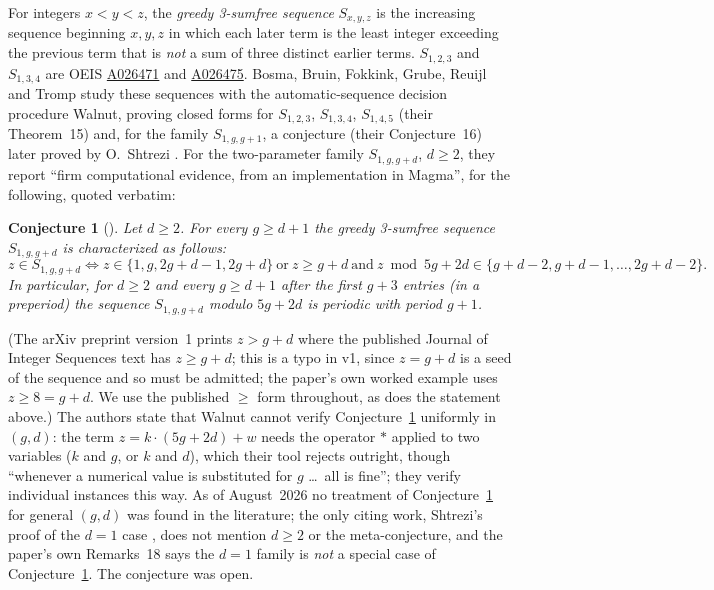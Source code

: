 \documentclass[10pt,reqno]{amsart}
\theoremstyle{plain}
\newtheorem{conjecture}[theorem]{Conjecture}
\theoremstyle{definition}
\theoremstyle{remark}
\numberwithin{theorem}{section}
\begin{document}
For integers $x<y<z$, the \emph{greedy 3-sumfree sequence} $S_{x,y,z}$ is the increasing
sequence beginning $x,y,z$ in which each later term is the least integer exceeding the
previous term that is \emph{not} a sum of three distinct earlier terms. $S_{1,2,3}$ and
$S_{1,3,4}$ are OEIS \href{https://oeis.org/A026471}{A026471} and
\href{https://oeis.org/A026475}{A026475}. Bosma, Bruin, Fokkink, Grube, Reuijl and Tromp
\cite{Fokkink} study these sequences with the automatic-sequence decision procedure Walnut,
proving closed forms for $S_{1,2,3}$, $S_{1,3,4}$, $S_{1,4,5}$ (their Theorem~15) and, for the
family $S_{1,g,g+1}$, a conjecture (their Conjecture~16) later proved by O.\ Shtrezi
\cite{Shtrezi}. For the two-parameter family $S_{1,g,g+d}$, $d \ge 2$, they report ``firm
computational evidence, from an implementation in Magma'', for the following, quoted
verbatim:

\begin{conjecture}[{\cite[Conjecture~17]{Fokkink}}]
\label{conj17}
Let $d\geq 2$. For every $g\geq d+1$ the greedy 3-sumfree sequence $S_{1,g,g+d}$ is
characterized as follows:
\[
z\in S_{1,g,g+d}\iff z\in\{1,g,2g+d-1,2g+d\}\ \text{or}\ z\geq g+d\ \text{and}\
z\bmod 5g+2d\in\{g+d-2, g+d-1,\ldots, 2g+d-2\}.
\]
In particular, for $d\geq 2$ and every $g\geq d+1$ after the first $g+3$ entries (in a
preperiod) the sequence $S_{1,g,g+d}$ modulo $5g+2d$ is periodic with period $g+1$.
\end{conjecture}

(The arXiv preprint version~1 \cite{Fokkink} prints $z>g+d$ where the published Journal of
Integer Sequences text has $z\ge g+d$; this is a typo in v1, since $z=g+d$ is a seed of the
sequence and so must be admitted; the paper's own worked example uses $z\ge 8 = g+d$. We use
the published $\ge$ form throughout, as does the statement above.) The authors state that
Walnut cannot verify Conjecture~\ref{conj17} uniformly in $(g,d)$: the term
$z=k\cdot(5g+2d)+w$ needs the operator $*$ applied to two variables ($k$ and $g$, or $k$ and
$d$), which their tool rejects outright, though ``whenever a numerical value is substituted
for $g$ \dots\ all is fine''; they verify individual instances this way. As of August~2026 no
treatment of Conjecture~\ref{conj17} for general $(g,d)$ was found in the literature; the only
citing work, Shtrezi's proof of the $d=1$ case \cite{Shtrezi}, does not mention $d\ge2$ or the
meta-conjecture, and the paper's own Remarks~18 says the $d=1$ family is \emph{not} a special
case of Conjecture~\ref{conj17}. The conjecture was open.
\end{document}
